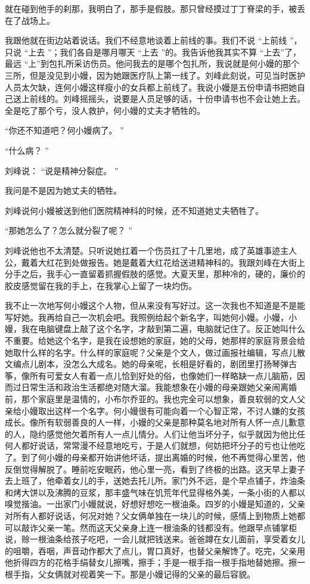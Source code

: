 \documentclass[12pt,twoside,openany]{book}
\begin{document}
就在碰到他手的刹那，我明白了，那手是假肢。那只曾经摸过丁丁脊梁的手，被丢在了战场上。

我跟他就在街边站着说话。我们不经意地谈着上前线的事。我们不说 “上前线 ”，只说 “上去 ”；我们各自是哪月哪天 “上去 ”的。我告诉他我其实不算 “上去”了，最远 “上”到包扎所采访伤员。他问我去的是哪个包扎所，我说就是何小嫚的那个三所，但是没见到小嫚，因为她跟医疗队上第一线了。刘峰此刻说，可见当时医护人员太欠缺，连何小嫚这样瘦小的女兵都上前线了。我说小嫚是五份申请书把她自己送上前线的。刘峰摇摇头，说要是人员足够的话，十份申请书也不会让她上去。全是吃了那个亏，没人救护，何小嫚的丈夫才牺牲的。

“你还不知道吧？何小嫚病了。 ”

“什么病？ ”

刘峰说： “说是精神分裂症。 ”

我问是不是因为她丈夫的牺牲。

刘峰说何小嫚被送到他们医院精神科的时候，还不知道她丈夫牺牲了。

“那她怎么了？怎么就分裂了呢？ ”

刘峰说他也不太清楚。只听说她扛着一个伤员扛了十几里地，成了英雄事迹主人公，戴着大红花到处做报告。她是戴着大红花给送进精神科的。我跟刘峰在大街上分手之后，我手心一直留着抓握假肢的感觉。大夏天里，那种冷的，硬的，廉价的胶皮感觉留在我的手上，在我掌心上留了一块灼伤。

我不止一次地写何小嫚这个人物，但从来没有写好过。这一次我也不知道是不是能写好她。我再给自己一次机会吧。我照例给起个新名字，叫她何小嫚。小嫚，小嫚，我在电脑键盘上敲了这个名字，才敲到第二遍，电脑就记住了。反正她叫什么不重要。给她这个名字，是我在设想她的家庭，她的父母，她那样的家庭背景会给她取什么样的名字。什么样的家庭呢？父亲是个文人，做过画报社编辑，写点儿散文编点儿剧本，没怎么大成名。她的母亲呢，长相是好看的，剧团里打扬琴弹古筝，像所有可爱女人有着一点儿恰到好处的俗，也像她们一样略缺一点儿脑筋，因而过日常生活和政治生活都绝对随大溜。我能想象在小嫚的母亲跟她父亲闹离婚前，那个家庭里是温情的，小布尔乔亚的。我也完全可以想象，善良软弱的文人父亲给小嫚取出这样一个名字。何小嫚很有可能向着一个心智正常，不讨人嫌的女孩成长。像所有软弱善良的人一样，小嫚的父亲是那种莫名地对所有人怀一点儿歉意的人，隐约感觉他欠着所有人一点儿情分。人们让他当坏分子，似乎就因为他比任何人都好说话，常常漫不经意地吃亏，于是人们就想，何妨把坏分子的亏也让他吃了。到了何小嫚的母亲都开始讲他坏话，提出离婚的时候，他不再觉得心里苦，他反倒觉得解脱了。睡前吃安眠药，他心里一亮，看到了终极的出路。这天早上妻子去上班了，他牵着女儿的手，送她去托儿所。家门外不远，是个早点铺子，炸油条和烤大饼以及沸腾的豆浆，那丰盛气味在饥荒年代显得格外美，一条小街的人都以嗅觉揩油。一出家门小嫚就说，好想好想吃一根油条。四岁的小嫚是知道的，父亲对所有人都好说话，何况对她？父女俩单独在一块儿的时候，感情上到物质上她都可以敲诈父亲一笔。然而这天父亲身上连一根油条的钱都没有。他跟早点铺掌柜说，赊一根油条给孩子吃吧，一会儿就把钱送来。爸爸蹲在女儿面前，享受着女儿的咀嚼，吞咽，声音动作都大了点儿，胃口真好，也替父亲解馋了。吃完，父亲用他折得四方的花格手绢替女儿擦嘴，擦手；手是一根手指一根手指地替她擦。擦一根手指，父女俩就对视着笑一下。那是小嫚记得的父亲的最后容貌。
\end{document}
